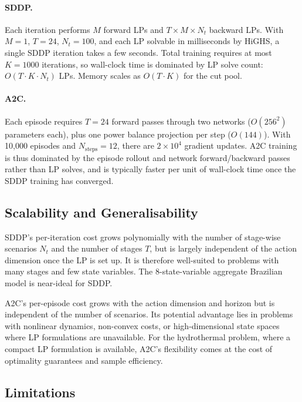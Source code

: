 \documentclass[11pt,letterpaper]{article}
\begin{document}
\paragraph{SDDP.}
Each iteration performs $M$ forward LPs and $T \times M \times N_t$ backward LPs.
With $M = 1$, $T = 24$, $N_t = 100$, and each LP solvable in milliseconds by HiGHS,
a single SDDP iteration takes a few seconds.  Total training requires at most
$K = 1000$ iterations, so wall-clock time is dominated by LP solve count: $O(T \cdot
K \cdot N_t)$ LPs.  Memory scales as $O(T \cdot K)$ for the cut pool.

\paragraph{A2C.}
Each episode requires $T = 24$ forward passes through two networks ($O(256^2)$
parameters each), plus one power balance projection per step ($O(144)$).
With 10{,}000 episodes and $N_{\mathrm{steps}} = 12$, there are $2\times10^4$
gradient updates.
A2C training is thus dominated by the episode rollout and network forward/backward
passes rather than LP solves, and is typically faster per unit of wall-clock time
once the SDDP training has converged.

\subsection{Scalability and Generalisability}

SDDP's per-iteration cost grows polynomially with the number of stage-wise scenarios
$N_t$ and the number of stages $T$, but is largely independent of the action
dimension once the LP is set up.  It is therefore well-suited to problems with
many stages and few state variables.  The 8-state-variable aggregate Brazilian
model is near-ideal for SDDP.

A2C's per-episode cost grows with the action dimension and horizon but is
independent of the number of scenarios.  Its potential advantage lies in
problems with nonlinear dynamics, non-convex costs, or high-dimensional state
spaces where LP formulations are unavailable.
For the hydrothermal problem, where a compact LP formulation is available, A2C's
flexibility comes at the cost of optimality guarantees and sample efficiency.

\subsection{Limitations}
\end{document}
